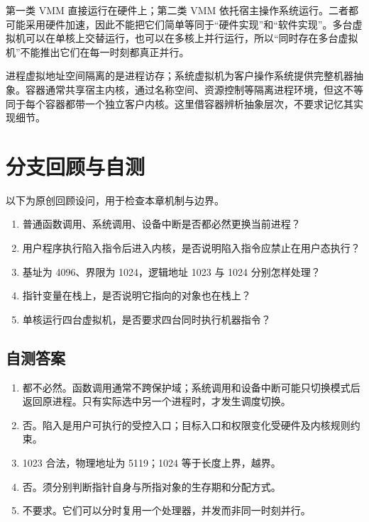 第一类 VMM 直接运行在硬件上；第二类 VMM 依托宿主操作系统运行。二者都可能采用硬件加速，因此不能把它们简单等同于``硬件实现''和``软件实现''。多台虚拟机可以在单核上交替运行，也可以在多核上并行运行，所以``同时存在多台虚拟机''不能推出它们在每一时刻都真正并行。

进程虚拟地址空间隔离的是进程访存；系统虚拟机为客户操作系统提供完整机器抽象。容器通常共享宿主内核，通过名称空间、资源控制等隔离进程环境，但这不等同于每个容器都带一个独立客户内核。这里借容器辨析抽象层次，不要求记忆其实现细节。

\section{分支回顾与自测}\label{OS01-1-review}

以下为原创回顾设问，用于检查本章机制与边界。

\begin{enumerate}
\def\labelenumi{\arabic{enumi}.}
\tightlist
\item
  普通函数调用、系统调用、设备中断是否都必然更换当前进程？
\item
  用户程序执行陷入指令后进入内核，是否说明陷入指令应禁止在用户态执行？
\item
  基址为 4096、界限为 1024，逻辑地址 1023 与 1024 分别怎样处理？
\item
  指针变量在栈上，是否说明它指向的对象也在栈上？
\item
  单核运行四台虚拟机，是否要求四台同时执行机器指令？
\end{enumerate}

\subsection{自测答案}\label{OS01-auto-2}

\begin{enumerate}
\def\labelenumi{\arabic{enumi}.}
\tightlist
\item
  都不必然。函数调用通常不跨保护域；系统调用和设备中断可能只切换模式后返回原进程。只有实际选中另一个进程时，才发生调度切换。
\item
  否。陷入是用户可执行的受控入口；目标入口和权限变化受硬件及内核规则约束。
\item
  1023 合法，物理地址为 5119；1024 等于长度上界，越界。
\item
  否。须分别判断指针自身与所指对象的生存期和分配方式。
\item
  不要求。它们可以分时复用一个处理器，并发而非同一时刻并行。
\end{enumerate}

